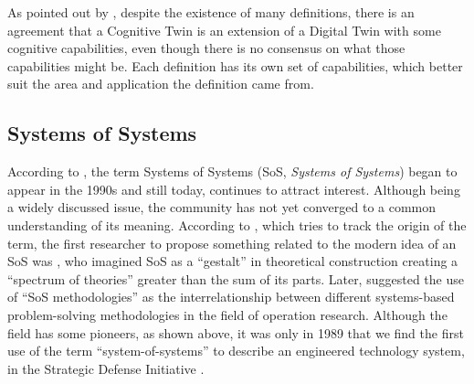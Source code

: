 As pointed out by \cite{abburu2020cognitive}, despite the existence of many definitions, there is an agreement that a Cognitive Twin is an extension of a Digital Twin with some cognitive capabilities, even though there is no consensus on what those capabilities might be. Each definition has its own set of capabilities, which better suit the area and application the definition came from.




\subsection{Systems of Systems}
\label{systemofsystems}

According to \cite{gudwin2016stateOfTheArt}, the term Systems of Systems (SoS, \emph{Systems of Systems}) began to appear in the 1990s and still today, continues to attract interest. Although being a widely discussed issue, the community has not yet converged to a common understanding of its meaning. According to  \citep{gorod2008system}, which tries to track the origin of the term, the first researcher to propose something related to the modern idea of an SoS was \cite{boulding1956sos}, who imagined SoS as a “gestalt” in theoretical construction creating a “spectrum of theories” greater than the sum of its parts. Later, \citet{jackson1984system} suggested the use of “SoS methodologies” as the interrelationship between different systems-based problem-solving methodologies in the field of operation research. Although the field has some pioneers, as shown above, it was only in 1989 that we find the first use of the term “system-of-systems” to describe an engineered technology system, in the Strategic Defense Initiative \citep{jacob1974logique, gpo1989restructuring, gorod2008system}.

